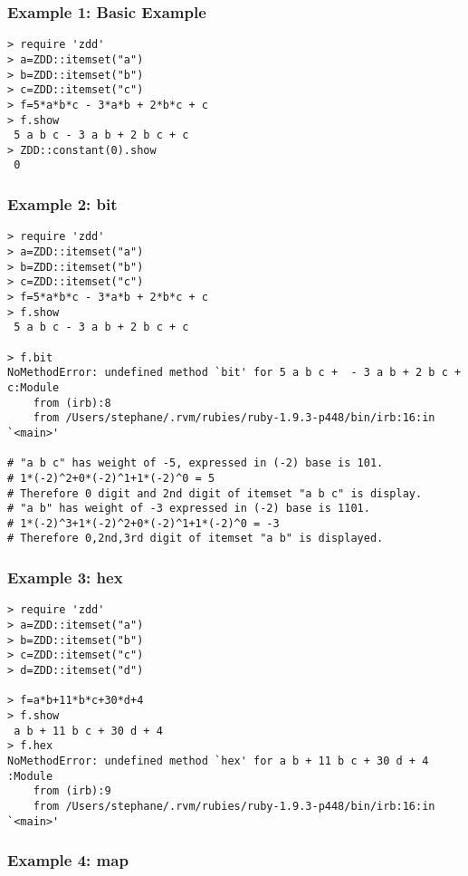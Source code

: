 \subsubsection*{Example 1: Basic Example}



\begin{Verbatim}[baselinestretch=0.7,frame=single]
> require 'zdd'
> a=ZDD::itemset("a")
> b=ZDD::itemset("b")
> c=ZDD::itemset("c")
> f=5*a*b*c - 3*a*b + 2*b*c + c
> f.show
 5 a b c - 3 a b + 2 b c + c
> ZDD::constant(0).show
 0
\end{Verbatim}
\subsubsection*{Example 2: bit}



\begin{Verbatim}[baselinestretch=0.7,frame=single]
> require 'zdd'
> a=ZDD::itemset("a")
> b=ZDD::itemset("b")
> c=ZDD::itemset("c")
> f=5*a*b*c - 3*a*b + 2*b*c + c
> f.show
 5 a b c - 3 a b + 2 b c + c

> f.bit
NoMethodError: undefined method `bit' for 5 a b c +  - 3 a b + 2 b c + c:Module
	from (irb):8
	from /Users/stephane/.rvm/rubies/ruby-1.9.3-p448/bin/irb:16:in `<main>'

# "a b c" has weight of -5, expressed in (-2) base is 101. 
# 1*(-2)^2+0*(-2)^1+1*(-2)^0 = 5
# Therefore 0 digit and 2nd digit of itemset "a b c" is display. 
# "a b" has weight of -3 expressed in (-2) base is 1101. 
# 1*(-2)^3+1*(-2)^2+0*(-2)^1+1*(-2)^0 = -3
# Therefore 0,2nd,3rd digit of itemset "a b" is displayed. 

\end{Verbatim}
\subsubsection*{Example 3: hex}



\begin{Verbatim}[baselinestretch=0.7,frame=single]
> require 'zdd'
> a=ZDD::itemset("a")
> b=ZDD::itemset("b")
> c=ZDD::itemset("c")
> d=ZDD::itemset("d")

> f=a*b+11*b*c+30*d+4
> f.show
 a b + 11 b c + 30 d + 4
> f.hex
NoMethodError: undefined method `hex' for a b + 11 b c + 30 d + 4 :Module
	from (irb):9
	from /Users/stephane/.rvm/rubies/ruby-1.9.3-p448/bin/irb:16:in `<main>'
\end{Verbatim}
\subsubsection*{Example 4: map}



